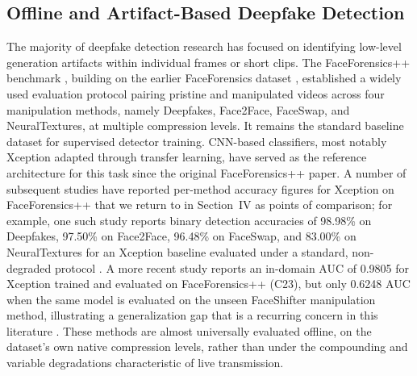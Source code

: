 \documentclass[conference]{IEEEtran}
\begin{document}
\subsection{Offline and Artifact-Based Deepfake Detection}
The majority of deepfake detection research has focused on identifying low-level generation artifacts within individual frames or short clips. The FaceForensics++ benchmark \cite{rossler2019faceforensicspp}, building on the earlier FaceForensics dataset \cite{roessler2018faceforensics}, established a widely used evaluation protocol pairing pristine and manipulated videos across four manipulation methods, namely Deepfakes, Face2Face, FaceSwap, and NeuralTextures, at multiple compression levels. It remains the standard baseline dataset for supervised detector training. CNN-based classifiers, most notably Xception \cite{chollet2017xception} adapted through transfer learning, have served as the reference architecture for this task since the original FaceForensics++ paper. A number of subsequent studies have reported per-method accuracy figures for Xception on FaceForensics++ that we return to in Section~IV as points of comparison; for example, one such study reports binary detection accuracies of 98.98\% on Deepfakes, 97.50\% on Face2Face, 96.48\% on FaceSwap, and 83.00\% on NeuralTextures for an Xception baseline evaluated under a standard, non-degraded protocol \cite{faketransformer2021}. A more recent study reports an in-domain AUC of 0.9805 for Xception trained and evaluated on FaceForensics++ (C23), but only 0.6248 AUC when the same model is evaluated on the unseen FaceShifter manipulation method, illustrating a generalization gap that is a recurring concern in this literature \cite{lightweightfusion2026}. These methods are almost universally evaluated offline, on the dataset's own native compression levels, rather than under the compounding and variable degradations characteristic of live transmission.
\end{document}
